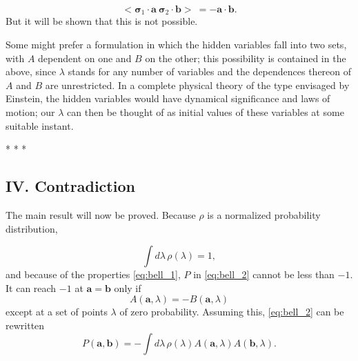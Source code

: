 \begin{equation}\label{eq:bell_3} %
< \pmb{\sigma}_1 \cdot \pmb{a} \  \pmb{\sigma}_2 \cdot \pmb{b} >\  = - \pmb{a} \cdot \pmb{b} .
\end{equation}
%
But it will be shown that this is not possible.

Some might prefer a formulation in which the hidden variables fall into two sets, with $A$ dependent on
one and $B$ on the other; this possibility is contained in the above, since $\lambda$ stands for any number of variables
and the dependences thereon of $A$ and $B$ are unrestricted. In a complete physical theory of the
type envisaged by Einstein, the hidden variables would have dynamical significance and laws of motion;
our $\lambda$ can then be thought of as initial values of these variables at some suitable instant.\\
\centerline{* * *}
%
\subsection*{IV. Contradiction}

The main result will now be proved. Because $\rho$ is a normalized probability distribution,

\setcounter{equation}{11}

\begin{equation}
\int d\lambda\, \rho(\lambda) = 1,
\end{equation}
and because of the properties \eqref{eq:bell_1}, $P$ in \eqref{eq:bell_2} cannot be less than $-1$. It can reach $-1$ at $\pmb{a} = \pmb{b}$ only if
\begin{equation}
A(\pmb{a}, \lambda) = - B(\pmb{a}, \lambda)
\end{equation}
except at a set of points $\lambda$ of zero probability. Assuming this, \eqref{eq:bell_2} can be rewritten
\begin{equation}
P(\pmb{a}, \pmb{b}) = - \int d\lambda\, \rho(\lambda) A(\pmb{a}, \lambda) A(\pmb{b}, \lambda).
\end{equation}

